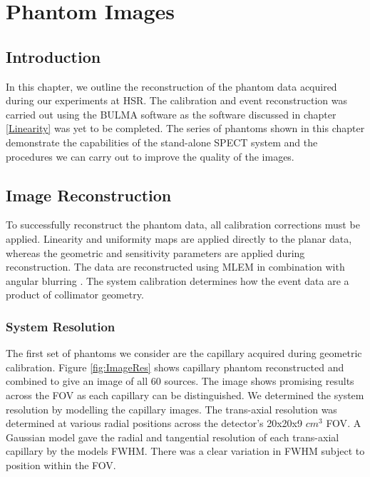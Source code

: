 \chapter{Phantom Images}
\label{IEEE}


\section{Introduction}
In this chapter, we outline the reconstruction of the phantom data acquired during our experiments at \acrshort{HSR}. The calibration and event reconstruction was carried out using the BULMA software as the software discussed in chapter \ref{Linearity} was yet to be completed. The series of phantoms shown in this chapter demonstrate the capabilities of the stand-alone \acrshort{SPECT} system and the procedures we can carry out to improve the quality of the images. 

\section{Image Reconstruction}
To successfully reconstruct the phantom data, all calibration corrections must be applied. Linearity and uniformity maps are applied directly to the planar data, whereas the geometric and sensitivity parameters are applied during reconstruction. The data are reconstructed using \acrshort{MLEM} \cite{4307558} in combination with angular blurring \cite{Bousse2013AngularReconstruction} \cite{8069508}. The system calibration determines how the event data are a product of collimator geometry.

\subsection{System Resolution}
The first set of phantoms we consider are the capillary acquired during geometric calibration. Figure \ref{fig:ImageRes} shows capillary phantom reconstructed and combined to give an image of all 60 sources. The image shows promising results across the \acrshort{FOV} as each capillary can be distinguished. We determined the system resolution by modelling the capillary images. The trans-axial resolution was determined at various radial positions across the detector's 20x20x9 $cm^3$ \acrshort{FOV}. A Gaussian model gave the radial and tangential resolution of each trans-axial capillary by the models \acrshort{FWHM}. There was a clear variation in \acrshort{FWHM} subject to position within the \acrshort{FOV}.

